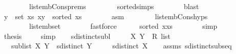 \begin{isabellebody}
\ \ \ \ \ \ \ \ list{\isacharunderscore}{\kern0pt}emb{\isacharunderscore}{\kern0pt}Cons{}{\isachardot}{\kern0pt}prems\isanewline
\ \ \ \ \ \ \ \ sorted{\isacharunderscore}{\kern0pt}simps{\isacharparenleft}{\kern0pt}{}{\isacharparenright}{\kern0pt}\isanewline
\ \ \ \ \ \ \isamarkupfalse%
\ blast\isanewline
\ \ \ \ \isamarkupfalse%
\ {\isachardoublequoteopen}{\isacharparenleft}{\kern0pt}{\isacharparenleft}{\kern0pt}{\isasymforall}y\ {\isasymin}\ set\ xs{\isachardot}{\kern0pt}\ x{\isasymle}y{\isacharparenright}{\kern0pt}\ {\isasymand}\ sorted\ xs{\isacharparenright}{\kern0pt}{\isachardoublequoteclose}\isanewline
\ \ \ \ \ \ \isamarkupfalse%
\ asm{\isacharparenleft}{\kern0pt}{}{\isacharparenright}{\kern0pt}\isanewline
\ \ \ \ \ \ \ \ list{\isacharunderscore}{\kern0pt}emb{\isacharunderscore}{\kern0pt}Cons{}{\isachardot}{\kern0pt}hyps{\isacharparenleft}{\kern0pt}{}{\isacharparenright}{\kern0pt}\isanewline
\ \ \ \ \ \ \ \ list{\isacharunderscore}{\kern0pt}emb{\isacharunderscore}{\kern0pt}set\isanewline
\ \ \ \ \ \ \isamarkupfalse%
\ fastforce\isanewline
\ \ \ \ \isamarkupfalse%
\ {\isachardoublequoteopen}sorted\ {\isacharparenleft}{\kern0pt}x{\isacharhash}{\kern0pt}xs{\isacharparenright}{\kern0pt}{\isachardoublequoteclose}\isanewline
\ \ \ \ \ \ \isamarkupfalse%
\ simp\isanewline
\ \ \ \ \isamarkupfalse%
\ {\isacharquery}{\kern0pt}thesis\ \isamarkupfalse%
\ {}\ \isamarkupfalse%
\ simp\isanewline
\ \ \isamarkupfalse%
\isanewline
{}\isamarkupfalse%
%
\endisatagproof
{\isafoldproof}%
%
\isadelimproof
\isanewline
%
\endisadelimproof
\isanewline
\isanewline
{}\isamarkupfalse%
\ sdistinct{\isacharunderscore}{\kern0pt}subl{\isacharcolon}{\kern0pt}\isanewline
\ \ \ \ \ X\ Y\ {\isacharcolon}{\kern0pt}{\isacharcolon}{\kern0pt}\ {\isachardoublequoteopen}R{}\ list{\isachardoublequoteclose}\isanewline
\ \ \ {\isachardoublequoteopen}sublist\ X\ Y{\isachardoublequoteclose}\ \ {\isachardoublequoteopen}sdistinct\ Y{\isachardoublequoteclose}\isanewline
\ \ \ \ \ {\isachardoublequoteopen}sdistinct\ X{\isachardoublequoteclose}\isanewline
%
\isadelimproof
\ \ %
\endisadelimproof
%
\isatagproof
{}\isamarkupfalse%
\ assms\ sdistinct{\isacharunderscore}{\kern0pt}subseq\ \isamarkupfalse%

\end{isabellebody}
